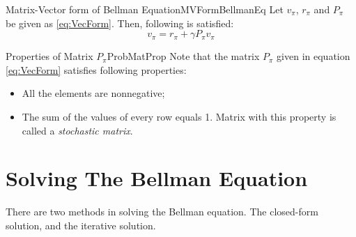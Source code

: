         \begin{thm}{Matrix-Vector form of Bellman Equation}{MVFormBellmanEq}
        Let $v_\pi$, $r_\pi$ and $P_\pi$ be given as \ref{eq:VecForm}. Then, following is satisfied:
            \begin{equation}
                v_\pi = r_\pi + \gamma P_\pi v_\pi
            \end{equation}
        \end{thm}
        \begin{rem}{Properties of Matrix $P_\pi$}{ProbMatProp}
            Note that the matrix $P_\pi$ given in equation \ref{eq:VecForm} satisfies following properties:
            \begin{itemize}
                \item All the elements are nonnegative;
                \item The sum of the values of every row equals 1. Matrix with this property is called a \emph{stochastic matrix}.
            \end{itemize}
        \end{rem}
\section{Solving The Bellman Equation}
    There are two methods in solving the Bellman equation. The closed-form solution, and the iterative solution.
